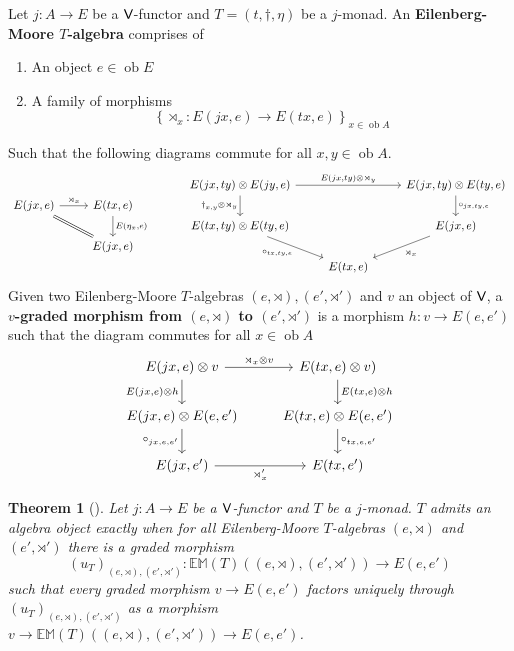 \documentclass[10pt,a4paper]{article}
\newcommand{\bb}[1]{\mathbb{#1}}
\newcommand{\cat}[1]{\textcat{#1}}
\newcommand{\textcat}[1]{{\normalfont\textsf{#1}}}
\newcommand{\set}[1]{\left\{#1\right\}}
\DeclareMathOperator{\ob}{ob}
\theoremstyle{plain}
\newtheorem{theorem}{Theorem}[subsection]
\theoremstyle{definition}
\theoremstyle{remark}
\begin{document}
\begin{definition}
    Let $j : A \to E$ be a $\cat V$-functor and $T = (t, \dag, \eta)$ be a $j$-monad. An \textbf{Eilenberg-Moore $T$-algebra} comprises of
    \begin{enumerate}
        \item An object $e\in\ob E$
        \item A family of morphisms
            \[
                \set{\rtimes_x:E(jx, e)\to E(tx, e)}_{x\in\ob A}
            \]
    \end{enumerate}
    Such that the following diagrams commute for all $x, y\in\ob A$.
    \[\begin{tikzcd}
        E(jx, e) \ar[dr, equal] \ar[r, "\rtimes_x"] & E(tx, e) \ar[d, "{E(\eta_x, e)}"]\\
                                                    & E(jx, e)
    \end{tikzcd}
    \hspace{3em}
    \begin{tikzcd}
        \ar[d, "\dag_{x, y}\otimes\rtimes_y"'] E(jx, ty) \otimes E(jy, e) \ar[rr, "{E(jx, ty)\otimes\rtimes_y}"] && E(jx, ty) \otimes E(ty, e) \ar[d, "\circ_{jx, ty, e}"]\\
        \ar[dr, "\circ_{tx, ty, e}"'] E(tx, ty)\otimes E(ty, e) && E(jx, e) \ar[dl, "\rtimes_x"]\\
                                                                & E(tx, e)
    \end{tikzcd}\]
    Given two Eilenberg-Moore $T$-algebras $(e, \rtimes), (e', \rtimes')$ and $v$ an object of $\cat V$, a \textbf{$v$-graded morphism from $(e, \rtimes)$ to $(e', \rtimes')$} is a morphism $h : v \to E(e, e')$ such that the diagram commutes for all $x\in\ob A$
    \[\begin{tikzcd}
        \ar[d, "{E(jx, e)\otimes h}"'] E(jx, e)\otimes v \ar[r, "\rtimes_x\otimes v"] & E(tx, e)\otimes v) \ar[d, "{E(tx, e)\otimes h}"]\\
        \ar[d, "\circ_{jx, e, e'}"'] E(jx, e)\otimes E(e, e') & E(tx, e) \otimes E(e, e') \ar[d, "\circ_{tx, e, e'}"]\\
        E(jx, e') \ar[r, "\rtimes_x'"'] & E(tx, e')
    \end{tikzcd}\]
\end{definition}

\begin{theorem}[{\cite[Theorem 8.19]{arkor2024formaltheoryrelativemonads}}]
    Let $j : A \to E$ be a $\cat V$-functor and $T$ be a $j$-monad. $T$ admits an algebra object exactly when for all Eilenberg-Moore $T$-algebras $(e, \rtimes)$ and $(e', \rtimes')$ there is a graded morphism
    \[
        (u_T)_{(e, \rtimes), (e', \rtimes')} : \bb{EM}(T)((e, \rtimes), (e', \rtimes')) \to E(e, e')
    \]
    such that every graded morphism $v\to E(e, e')$ factors uniquely through $(u_T)_{(e, \rtimes), (e', \rtimes')}$ as a morphism $v \to \bb{EM}(T)((e, \rtimes), (e', \rtimes')) \to E(e, e')$.
\end{theorem}
\end{document}
